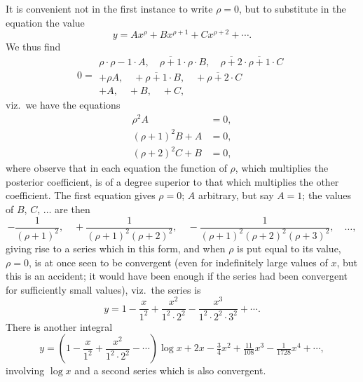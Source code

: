 \documentclass[11pt]{article}
\begin{document}
It is convenient not in the first instance to write $\rho=0$, but to substitute in the equation the value
\[
y = Ax^{\rho} + Bx^{\rho+1} + Cx^{\rho+2} + \dotsb.
\]
We thus find
\[
0 = \begin{array}{l} \rho\cdot\rho-1\cdot A,\quad \overline{\rho+1}\cdot\rho\cdot B,\quad \overline{\rho+2}\cdot\overline{\rho+1}\cdot C \\ + \rho A,\quad +\overline{\rho+1}\cdot B,\quad +\overline{\rho+2}\cdot C \\ + A,\quad + B,\quad + C, \end{array}
\]
viz.\ we have the equations
\begin{align*}
\rho^2 A &= 0,\\
(\rho+1)^2 B + A &= 0,\\
(\rho+2)^2 C + B &= 0,
\end{align*}
where observe that in each equation the function of $\rho$, which multiplies the posterior coefficient, is of a degree superior to that which multiplies the other coefficient. The first equation gives $\rho=0$; $A$ arbitrary, but say $A=1$; the values of $B$, $C$, $\dotsc$ are then
\[
-\frac{1}{(\rho+1)^2},\quad +\frac{1}{(\rho+1)^2(\rho+2)^2},\quad -\frac{1}{(\rho+1)^2(\rho+2)^2(\rho+3)^2},\quad \dotsc,
\]
giving rise to a series which in this form, and when $\rho$ is put equal to its value, $\rho=0$, is at once seen to be convergent (even for indefinitely large values of $x$, but this is an accident; it would have been enough if the series had been convergent for sufficiently small values), viz.\ the series is
\[
y = 1 - \frac{x}{1^2} + \frac{x^2}{1^2\cdot 2^2} - \frac{x^3}{1^2\cdot 2^2\cdot 3^2} + \dotsb.
\]
There is another integral
\[
y = \left(1 - \frac{x}{1^2} + \frac{x^2}{1^2\cdot 2^2} - \dotsb\right)\log x + 2x - \tfrac{3}{4}x^2 + \tfrac{11}{108}x^3 - \tfrac{1}{1728}x^4 + \dotsb,
\]
involving $\log x$ and a second series which is also convergent.

\medskip
\end{document}
